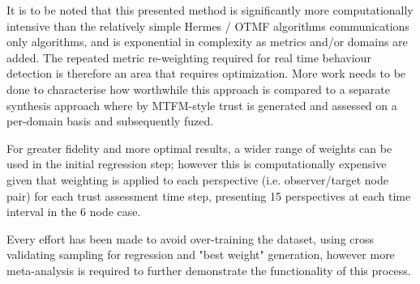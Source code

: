 \documentclass{aamas2016}
\begin{document}
It is to be noted that this presented method is significantly more computationally intensive than the relatively simple Hermes / OTMF algorithms communications only algorithms, and is exponential in complexity as metrics and/or domains are added. The repeated metric re-weighting required for real time behaviour detection is therefore an area that requires optimization. More work needs to be done to characterise how worthwhile this approach is compared to a separate synthesis approach where by MTFM-style trust is generated and assessed on a per-domain basis and subsequently fuzed.

For greater fidelity and more optimal results, a wider range of weights can be used in the initial regression step; however this is computationally expensive given that weighting is applied to each perspective (i.e. observer/target node pair) for each trust assessment time step, presenting 15 perspectives at each time interval in the 6 node case.

Every effort has been made to avoid over-training the dataset, using cross validating sampling for regression and "best weight" generation, however more meta-analysis is required to further demonstrate the functionality of this process.


%

%
\end{document}
